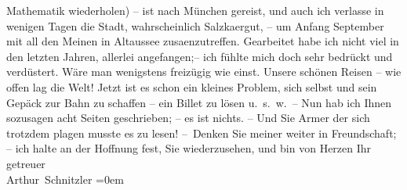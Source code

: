 \begin{ledgroupsized}[t]{13cm}
                    Mathematik wiederholen) – ist nach München
                    gereist, und auch ich verlasse in wenigen Tagen die Stadt, wahrschein{\pb}lich Salzka{\geminationm}ergut, – um Anfang September mit all den
                    Meinen in Altaussee zusa{\geminationm}enzutreffen.\pend
           \pstart
           Gearbeitet habe ich nicht viel in den letzten Jahren, allerlei angefangen;– ich
                    fühlte mich doch sehr bedrückt und verdüstert. Wäre man wenigstens freizügig wie
                    einst. Unsere schönen Reisen – wie offen lag die Welt! Jetzt ist es schon ein
                    kleines Problem, sich selbst und sein Gepäck zur Bahn zu schaffen – ein Billet
                    zu lösen u. s. w. –\pend
           \pstart
           Nun hab ich Ihnen sozusagen acht Seiten geschrieben; – es ist nichts. – Und Sie
                    Armer der sich trotzdem plagen musste es zu lesen!\pend
           \pstart
           – Denken Sie meiner weiter in Freundschaft; – ich halte an der Hoffnung fest, Sie
                    wiederzusehen, und bin von Herzen\pend
           \pstart
           Ihr getreuer{\\[\baselineskip]}\spacefill\mbox{Arthur Schnitzler}\pend
           \leftskip=0em{}
         
         \endnumbering{}\end{ledgroupsized}  \newcommand{\dateiname}{L02353}\newcommand{\titel}{Arthur Schnitzler an Georg Brandes, 16. 8. 1920}\newcommand{\editorInnen}{Martin Anton Müller und Gerd-Hermann Susen}
      